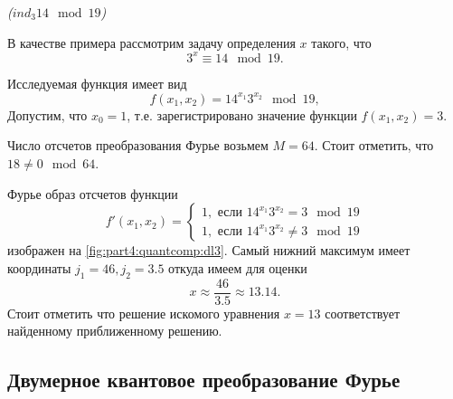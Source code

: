 \begin{example}
\emph{($ind_3{14} \mod{19}$)}
%

В качестве примера рассмотрим задачу определения $x$ такого, что 
\[
3^x \equiv 14 \mod 19.
\]

Исследуемая функция имеет вид
\[
f(x_1, x_2) = 14^{x_1} 3^{x_2} \mod 19,
\]
Допустим, что $x_0 = 1$, т.е. зарегистрировано значение функции
$f(x_1, x_2) = 3$.



Число отсчетов преобразования Фурье возьмем $M=64$. Стоит отметить,
что $18 \ne 0 \mod 64$.

Фурье образ отсчетов функции 
\[
f'(x_1, x_2) = 
\begin{cases}
1, \mbox{ если } 14^{x_1} 3^{x_2} = 3 \mod 19 \\
1, \mbox{ если } 14^{x_1} 3^{x_2} \ne 3 \mod 19 
\end{cases}
\]
изображен на \autoref{fig:part4:quantcomp:dl3}. Самый нижний максимум
имеет координаты $j_1 = 46, j_2 = 3.5$ откуда имеем для оценки 
\[
x \approx \frac{46}{3.5} \approx 13.14.
\]
Стоит отметить что решение искомого уравнения $x = 13$ соответствует
найденному приближенному решению.
\label{ex:part4:quantcomp:discretlog:periodfinding2}
\end{example}


\subsection{Двумерное квантовое преобразование Фурье}



